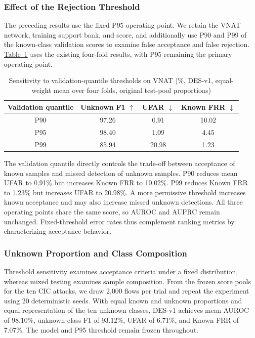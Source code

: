 \subsubsection{Effect of the Rejection Threshold}
The preceding results use the fixed P95 operating point. We retain the VNAT network, training support bank, and score, and additionally use P90 and P99 of the known-class validation scores to examine false acceptance and false rejection. \hyperref[tab:source-10]{Table~\ref*{tab:source-10}} uses the existing four-fold results, with P95 remaining the primary operating point.


\begin{table}[H]
\centering
\begingroup
\renewcommand{\thetable}{4-11}
\caption{Sensitivity to validation-quantile thresholds on VNAT (\%, DES-v1, equal-weight mean over four folds, original test-pool proportions)}\label{tab:source-10}
\fontsize{7}{8.5}\selectfont
\setlength{\tabcolsep}{2pt}
\begin{tabular}{@{}cccc@{}}
\hline
Validation quantile & Unknown F1 $\uparrow$ & UFAR $\downarrow$ & Known FRR $\downarrow$ \\
\hline
P90 & 97.26 & 0.91 & 10.02 \\
P95 & 98.40 & 1.09 & 4.45 \\
P99 & 85.94 & 20.98 & 1.23 \\
\hline
\end{tabular}
\endgroup
\end{table}


The validation quantile directly controls the trade-off between acceptance of known samples and missed detection of unknown samples. P90 reduces mean UFAR to 0.91\% but increases Known FRR to 10.02\%. P99 reduces Known FRR to 1.23\% but increases UFAR to 20.98\%. A more permissive threshold increases known acceptance and may also increase missed unknown detections. All three operating points share the same score, so AUROC and AUPRC remain unchanged. Fixed-threshold error rates thus complement ranking metrics by characterizing acceptance behavior.

\subsubsection{Unknown Proportion and Class Composition}
Threshold sensitivity examines acceptance criteria under a fixed distribution, whereas mixed testing examines sample composition. From the frozen score pools for the ten CIC attacks, we draw 2,000 flows per trial and repeat the experiment using 20 deterministic seeds. With equal known and unknown proportions and equal representation of the ten unknown classes, DES-v1 achieves mean AUROC of 98.10\%, unknown-class F1 of 93.12\%, UFAR of 6.71\%, and Known FRR of 7.07\%. The model and P95 threshold remain frozen throughout.

